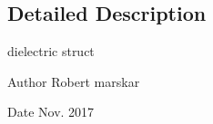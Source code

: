 \subsection{Detailed Description}
dielectric struct 

\begin{DoxyAuthor}{Author}
Robert marskar 
\end{DoxyAuthor}
\begin{DoxyDate}{Date}
Nov. 2017 
\end{DoxyDate}
